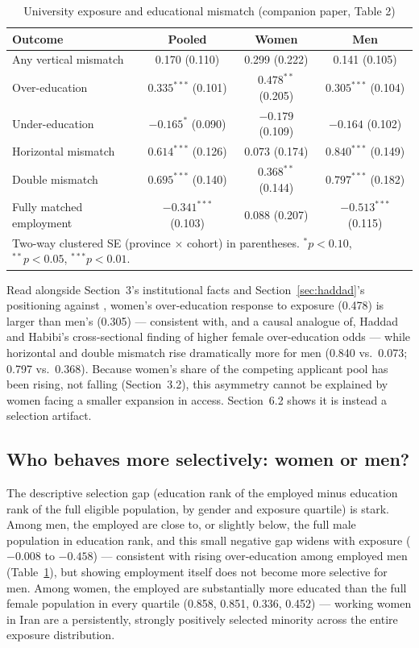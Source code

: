 \documentclass[11pt]{article}
\begin{document}
\begin{table}[htbp]
\centering
\caption{University exposure and educational mismatch (companion paper, Table 2)}
\label{tab:mismatch}
\begin{tabular}{lccc}
\toprule
Outcome & Pooled & Women & Men \\
\midrule
Any vertical mismatch      & 0.170 (0.110)      & 0.299 (0.222)      & 0.141 (0.105) \\
Over-education             & $0.335^{***}$ (0.101) & $0.478^{**}$ (0.205) & $0.305^{***}$ (0.104) \\
Under-education            & $-0.165^{*}$ (0.090)  & $-0.179$ (0.109)     & $-0.164$ (0.102) \\
Horizontal mismatch        & $0.614^{***}$ (0.126) & $0.073$ (0.174)      & $0.840^{***}$ (0.149) \\
Double mismatch            & $0.695^{***}$ (0.140) & $0.368^{**}$ (0.144)  & $0.797^{***}$ (0.182) \\
Fully matched employment   & $-0.341^{***}$ (0.103) & $0.088$ (0.207)     & $-0.513^{***}$ (0.115) \\
\bottomrule
\multicolumn{4}{p{0.9\textwidth}}{\footnotesize Two-way clustered SE (province $\times$ cohort) in parentheses. $^{*}p<0.10$, $^{**}p<0.05$, $^{***}p<0.01$.}
\end{tabular}
\end{table}

Read alongside Section~3's institutional facts and Section~\ref{sec:haddad}'s positioning against \citet{haddad2017}, women's over-education response to exposure (0.478) is larger than men's (0.305) --- consistent with, and a causal analogue of, Haddad and Habibi's cross-sectional finding of higher female over-education odds --- while horizontal and double mismatch rise dramatically more for men (0.840 vs.\ 0.073; 0.797 vs.\ 0.368). Because women's share of the competing applicant pool has been rising, not falling (Section~3.2), this asymmetry cannot be explained by women facing a smaller expansion in access. Section~6.2 shows it is instead a selection artifact.

\subsection{Who behaves more selectively: women or men?}

The descriptive selection gap (education rank of the employed minus education rank of the full eligible population, by gender and exposure quartile) is stark. Among men, the employed are close to, or slightly below, the full male population in education rank, and this small negative gap widens with exposure ($-0.008$ to $-0.458$) --- consistent with rising over-education among employed men (Table~\ref{tab:mismatch}), but showing employment itself does not become more selective for men. Among women, the employed are substantially more educated than the full female population in every quartile (0.858, 0.851, 0.336, 0.452) --- working women in Iran are a persistently, strongly positively selected minority across the entire exposure distribution.
\end{document}
